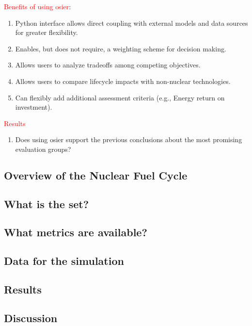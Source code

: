 \textcolor{red}{Benefits of using \ac{osier}}:
\begin{enumerate}
    \item Python interface allows direct coupling with external models and data sources for greater flexibility.
    \item Enables, but does not require, a weighting scheme for decision making.
    \item Allows users to analyze tradeoffs among competing objectives.
    \item Allows users to compare lifecycle impacts with non-nuclear technologies.
    \item Can flexibly add additional assessment criteria (e.g., Energy return on investment). 
\end{enumerate}

\textcolor{red}{Results}
\begin{enumerate}
    \item Does using \ac{osier} support the previous conclusions about the most promising evaluation groups?
\end{enumerate}

\subsection{Overview of the Nuclear Fuel Cycle}

\subsection{What is the \ac{set}?}

\subsection{What metrics are available?}

\subsection{Data for the simulation}

\subsection{Results}

\subsection{Discussion}


